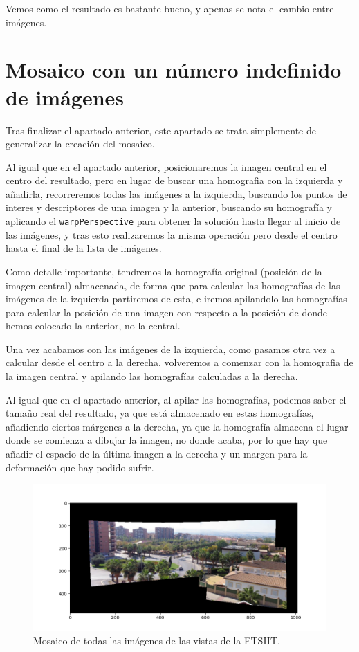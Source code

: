 \documentclass[12pt, spanish]{article}
\begin{document}
Vemos como el resultado es bastante bueno, y apenas se nota el cambio entre imágenes.


\section{Mosaico con un número indefinido de imágenes}

Tras finalizar el apartado anterior, este apartado se trata simplemente de generalizar la creación del mosaico.

Al igual que en el apartado anterior, posicionaremos la imagen central en el centro del resultado, pero en lugar de buscar una homografia con la izquierda y añadirla, recorreremos todas las imágenes a la izquierda, buscando los puntos de interes y descriptores de una imagen y la anterior, buscando su homografía y aplicando el \texttt{warpPerspective} para obtener la solución hasta llegar al inicio de las imágenes, y tras esto realizaremos la misma operación pero desde el centro hasta el final de la lista de imágenes.

Como detalle importante, tendremos la homografía original (posición de la imagen central) almacenada, de forma que para calcular las homografías de las imágenes de la izquierda partiremos de esta, e iremos apilandolo las homografías para calcular la posición de una imagen con respecto a la posición de donde hemos colocado la anterior, no la central.

Una vez acabamos con las imágenes de la izquierda, como pasamos otra vez a calcular desde el centro a la derecha, volveremos a comenzar con la homografia de la imagen central y apilando las homografías calculadas a la derecha.

Al igual que en el apartado anterior, al apilar las homografías, podemos saber el tamaño real del resultado, ya que está almacenado en estas homografías, añadiendo ciertos márgenes a la derecha, ya que la homografía almacena el lugar donde se comienza a dibujar la imagen, no donde acaba, por lo que hay que añadir el espacio de la última imagen a la derecha y un margen para la deformación que hay podido sufrir.

\begin{figure}[H]
  \centering
      \includegraphics[width=\textwidth]{mosaico_etsiit.png}
 		\caption{Mosaico de todas las imágenes de las vistas de la ETSIIT.}
\end{figure}
\end{document}
